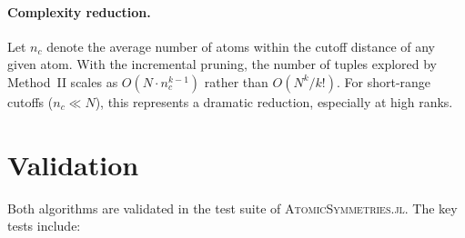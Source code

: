 \documentclass[twocolumn,amsmath,amssymb,aps,prb,10pt,floatfix]{revtex4-2}
\begin{document}
\paragraph{Complexity reduction.}
Let $n_c$ denote the average number of atoms within the cutoff distance of any given atom.
With the incremental pruning, the number of tuples explored by Method~II scales as $O(N \cdot n_c^{k-1})$ rather than $O(N^k / k!)$.
For short-range cutoffs ($n_c \ll N$), this represents a dramatic reduction, especially at high ranks.


\section{Validation}
\label{sec:validation}

Both algorithms are validated in the test suite of \textsc{AtomicSymmetries.jl}.
The key tests include:
\end{document}
